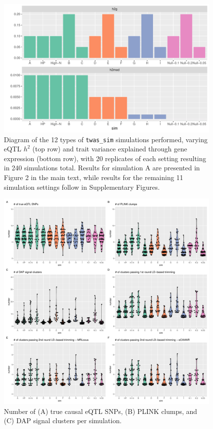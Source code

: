 \documentclass[11pt]{article}
\begin{document}
\begin{figure}[!ht]
  \centering
  \includegraphics[width=.7\textwidth]{figs/sim_types}
  \caption{Diagram of the 12 types of \texttt{twas\_sim} simulations
    performed, varying eQTL $h^2$ (top row) and trait variance explained
    through gene expression (bottom row), with 20 replicates of each
    setting resulting in 240 simulations total. Results for simulation
    A are presented in Figure 2 in the main text, while results for
    the remaining 11 simulation settings follow in Supplementary
    Figures.}
\end{figure}

\begin{figure}[!ht]
  \centering
  \includegraphics[width=\textwidth]{figs/sim_details}
  \caption{Number of (A) true causal eQTL SNPs, (B) PLINK clumps, and
    (C) DAP signal clusters per simulation.}
\end{figure}
\end{document}
